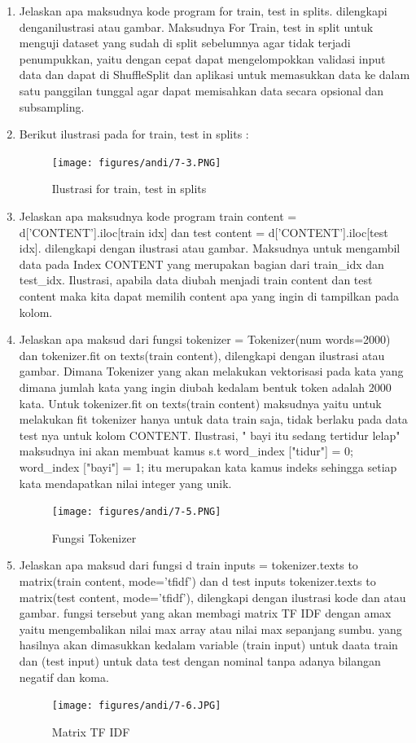 \begin{enumerate}
\item Jelaskan apa maksudnya kode program for train, test in splits. dilengkapi denganilustrasi atau gambar.
\subitem Maksudnya For Train, test in split untuk menguji dataset yang sudah di split sebelumnya agar tidak terjadi penumpukkan, yaitu dengan cepat dapat mengelompokkan validasi input data dan dapat di ShuffleSplit dan aplikasi untuk memasukkan data ke dalam satu panggilan tunggal agar dapat memisahkan data secara opsional dan subsampling.

\item Berikut ilustrasi pada for train, test in splits :
\begin{figure}[ht]
\centering
\texttt{[image: figures/andi/7-3.PNG]}
\caption{Ilustrasi for train, test in splits}
\label{Teori}
\end{figure}

\item Jelaskan apa maksudnya kode program train content = d[’CONTENT’].iloc[train idx] dan test content = d[’CONTENT’].iloc[test idx]. dilengkapi dengan ilustrasi atau gambar.
\subitem Maksudnya untuk mengambil data pada Index CONTENT yang merupakan bagian dari train\_idx dan test\_idx. 
Ilustrasi, apabila data diubah menjadi train content dan test content maka kita dapat memilih content apa yang ingin di tampilkan pada kolom.

\item Jelaskan apa maksud dari fungsi tokenizer = Tokenizer(num words=2000) dan tokenizer.fit on texts(train content), dilengkapi dengan ilustrasi atau gambar.
\subitem Dimana Tokenizer yang akan melakukan vektorisasi pada kata yang dimana jumlah kata yang ingin diubah kedalam bentuk token adalah 2000 kata. Untuk tokenizer.fit on texts(train content) maksudnya yaitu untuk melakukan fit tokenizer hanya untuk data train saja, tidak berlaku pada data test nya untuk kolom CONTENT. Ilustrasi, " bayi itu sedang tertidur lelap" maksudnya ini akan membuat kamus s.t word\_index ["tidur"] = 0; word\_index ["bayi"] = 1; itu merupakan kata  kamus indeks sehingga setiap kata mendapatkan nilai integer yang unik.
\begin{figure}[!htbp]
	\centerline{\texttt{[image: figures/andi/7-5.PNG]}}
	\caption{Fungsi Tokenizer}
	\label{Teori}
\end{figure}

\item Jelaskan apa maksud dari fungsi d train inputs = tokenizer.texts to matrix(train content, mode=’tfidf’) dan d test inputs  tokenizer.texts to matrix(test content, mode=’tfidf’), dilengkapi dengan ilustrasi kode dan atau gambar.
\subitem fungsi tersebut yang akan membagi matrix TF IDF dengan amax yaitu mengembalikan nilai max array atau nilai max sepanjang sumbu. yang hasilnya akan dimasukkan kedalam variable (train input) untuk daata train dan (test input) untuk data test dengan nominal tanpa adanya bilangan negatif dan koma.
\begin{figure}[!htbp]
	\centerline{\texttt{[image: figures/andi/7-6.JPG]}}
	\caption{Matrix TF IDF}
	\label{Teori}
\end{figure}


\end{enumerate}
